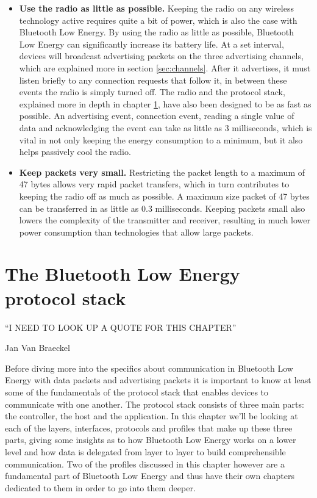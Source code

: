 \documentclass[pdftex,a4paper,12pt,twoside]{report}
\begin{document}
\begin{itemize}
\item{\textbf{Use the radio as little as possible.} Keeping the radio on any wireless technology active requires quite a bit of power, which is also the case with Bluetooth Low Energy. By using the radio as little as possible, Bluetooth Low Energy can significantly increase its battery life. At a set interval, devices will broadcast advertising packets on the three advertising channels, which are explained more in section \ref{sec:channels}. After it advertises, it must listen briefly to any connection requests that follow it, in between these events the radio is simply turned off. The radio and the protocol stack, explained more in depth in chapter \ref{ch:protocolstack}, have also been designed to be as fast as possible. An advertising event, connection event, reading a single value of data and acknowledging the event can take as little as 3 milliseconds, which is vital in not only keeping the energy consumption to a minimum, but it also helps passively cool the radio.}

\item{\textbf{Keep packets very small.} Restricting the packet length to a maximum of 47 bytes allows very rapid packet transfers, which in turn contributes to keeping the radio off as much as possible. A maximum size packet of 47 bytes can be transferred in as little as 0.3 milliseconds. Keeping packets small also lowers the complexity of the transmitter and receiver, resulting in much lower power consumption than technologies that allow large packets.}
\end{itemize}

\chapter{The Bluetooth Low Energy protocol stack}
\label{ch:protocolstack}
\epigraph{``I NEED TO LOOK UP A QUOTE FOR THIS CHAPTER''}{Jan Van Braeckel}
Before diving more into the specifics about communication in Bluetooth Low Energy with data packets and advertising packets it is important to know at least some of the fundamentals of the protocol stack that enables devices to communicate with one another. The protocol stack consists of three main parts: the controller, the host and the application. In this chapter we'll be looking at each of the layers, interfaces, protocols and profiles that make up these three parts, giving some insights as to how Bluetooth Low Energy works on a lower level and how data is delegated from layer to layer to build comprehensible communication. Two of the profiles discussed in this chapter however are a fundamental part of Bluetooth Low Energy and thus have their own chapters dedicated to them in order to go into them deeper.
\end{document}
